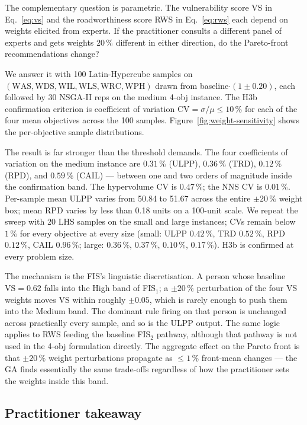 \documentclass[applsci,article,submit,moreauthors,pdftex]{Definitions/mdpi}
\begin{document}
The complementary question is parametric. The vulnerability score VS in
Eq.~\eqref{eq:vs} and the roadworthiness score RWS in Eq.~\eqref{eq:rws}
each depend on weights elicited from experts. If the practitioner consults
a different panel of experts and gets weights $20\,\%$ different in either
direction, do the Pareto-front recommendations change?

We answer it with 100 Latin-Hypercube samples on
$(\mathrm{WAS}, \mathrm{WDS}, \mathrm{WIL}, \mathrm{WLS}, \mathrm{WRC},
\mathrm{WPH})$ drawn from baseline$\cdot(1 \pm 0.20)$, each followed by 30
NSGA-II reps on the medium 4-obj instance. The H3b confirmation criterion
is coefficient of variation $\mathrm{CV} = \sigma / \mu \le 10\,\%$ for each
of the four mean objectives across the 100 samples.
Figure~\ref{fig:weight-sensitivity} shows the per-objective sample
distributions.

The result is far stronger than the threshold demands. The four
coefficients of variation on the medium instance are $0.31\,\%$ (ULPP),
$0.36\,\%$ (TRD), $0.12\,\%$ (RPD), and $0.59\,\%$ (CAIL) --- between
one and two orders of magnitude inside the confirmation band. The
hypervolume CV is $0.47\,\%$; the NNS CV is $0.01\,\%$. Per-sample
mean ULPP varies from 50.84 to 51.67 across the entire $\pm 20\,\%$
weight box; mean RPD varies by less than 0.18 units on a 100-unit
scale. We repeat the sweep with 20 LHS samples on the small and large
instances; CVs remain below $1\,\%$ for every objective at every size
(small: ULPP $0.42\,\%$, TRD $0.52\,\%$, RPD $0.12\,\%$, CAIL
$0.96\,\%$; large: $0.36\,\%$, $0.37\,\%$, $0.10\,\%$, $0.17\,\%$).
H3b is confirmed at every problem size.

The mechanism is the FIS's linguistic discretisation. A person whose
baseline $\mathrm{VS} = 0.62$ falls into the High band of FIS$_1$; a
$\pm 20\,\%$ perturbation of the four VS weights moves $\mathrm{VS}$ within
roughly $\pm 0.05$, which is rarely enough to push them into the Medium
band. The dominant rule firing on that person is unchanged across
practically every sample, and so is the ULPP output. The same logic applies
to RWS feeding the baseline FIS$_2$ pathway, although that pathway is not
used in the 4-obj formulation directly. The aggregate effect on the Pareto
front is that $\pm 20\,\%$ weight perturbations propagate as $\le 1\,\%$
front-mean changes --- the GA finds essentially the same trade-offs
regardless of how the practitioner sets the weights inside this band.

\subsection{Practitioner takeaway}\label{sec:sens-takeaway}
\end{document}

